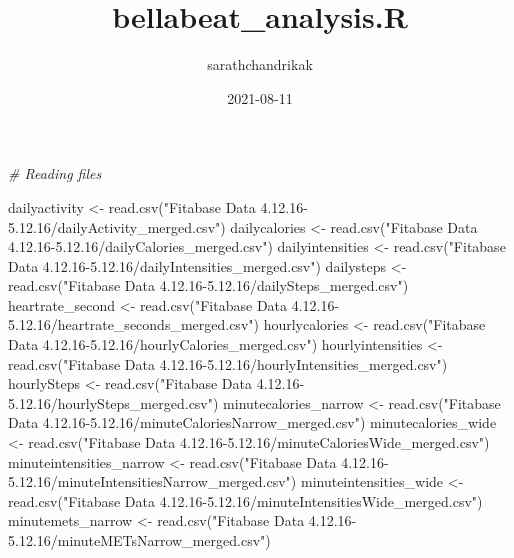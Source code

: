 \documentclass[
]{article}
\title{bellabeat\_analysis.R}
\author{sarathchandrikak}
\date{2021-08-11}
\newenvironment{Shaded}{\begin{snugshade}}{\end{snugshade}}
\newcommand{\CommentTok}[1]{\textcolor[rgb]{0.56,0.35,0.01}{\textit{#1}}}
\newcommand{\FunctionTok}[1]{\textcolor[rgb]{0.00,0.00,0.00}{#1}}
\newcommand{\NormalTok}[1]{#1}
\newcommand{\OtherTok}[1]{\textcolor[rgb]{0.56,0.35,0.01}{#1}}
\newcommand{\StringTok}[1]{\textcolor[rgb]{0.31,0.60,0.02}{#1}}
\begin{document}
\maketitle

\begin{Shaded}
\begin{Highlighting}[]
\CommentTok{\# Reading files}

\NormalTok{dailyactivity }\OtherTok{\textless{}{-}} \FunctionTok{read.csv}\NormalTok{(}\StringTok{"Fitabase Data 4.12.16{-}5.12.16/dailyActivity\_merged.csv"}\NormalTok{)}
\NormalTok{dailycalories }\OtherTok{\textless{}{-}} \FunctionTok{read.csv}\NormalTok{(}\StringTok{"Fitabase Data 4.12.16{-}5.12.16/dailyCalories\_merged.csv"}\NormalTok{)}
\NormalTok{dailyintensities }\OtherTok{\textless{}{-}} \FunctionTok{read.csv}\NormalTok{(}\StringTok{"Fitabase Data 4.12.16{-}5.12.16/dailyIntensities\_merged.csv"}\NormalTok{)}
\NormalTok{dailysteps }\OtherTok{\textless{}{-}} \FunctionTok{read.csv}\NormalTok{(}\StringTok{"Fitabase Data 4.12.16{-}5.12.16/dailySteps\_merged.csv"}\NormalTok{)}
\NormalTok{heartrate\_second }\OtherTok{\textless{}{-}} \FunctionTok{read.csv}\NormalTok{(}\StringTok{"Fitabase Data 4.12.16{-}5.12.16/heartrate\_seconds\_merged.csv"}\NormalTok{)}
\NormalTok{hourlycalories }\OtherTok{\textless{}{-}} \FunctionTok{read.csv}\NormalTok{(}\StringTok{"Fitabase Data 4.12.16{-}5.12.16/hourlyCalories\_merged.csv"}\NormalTok{)}
\NormalTok{hourlyintensities }\OtherTok{\textless{}{-}} \FunctionTok{read.csv}\NormalTok{(}\StringTok{"Fitabase Data 4.12.16{-}5.12.16/hourlyIntensities\_merged.csv"}\NormalTok{)}
\NormalTok{hourlySteps }\OtherTok{\textless{}{-}} \FunctionTok{read.csv}\NormalTok{(}\StringTok{"Fitabase Data 4.12.16{-}5.12.16/hourlySteps\_merged.csv"}\NormalTok{)}
\NormalTok{minutecalories\_narrow }\OtherTok{\textless{}{-}} \FunctionTok{read.csv}\NormalTok{(}\StringTok{"Fitabase Data 4.12.16{-}5.12.16/minuteCaloriesNarrow\_merged.csv"}\NormalTok{)}
\NormalTok{minutecalories\_wide }\OtherTok{\textless{}{-}} \FunctionTok{read.csv}\NormalTok{(}\StringTok{"Fitabase Data 4.12.16{-}5.12.16/minuteCaloriesWide\_merged.csv"}\NormalTok{)}
\NormalTok{minuteintensities\_narrow }\OtherTok{\textless{}{-}} \FunctionTok{read.csv}\NormalTok{(}\StringTok{"Fitabase Data 4.12.16{-}5.12.16/minuteIntensitiesNarrow\_merged.csv"}\NormalTok{)}
\NormalTok{minuteintensities\_wide }\OtherTok{\textless{}{-}} \FunctionTok{read.csv}\NormalTok{(}\StringTok{"Fitabase Data 4.12.16{-}5.12.16/minuteIntensitiesWide\_merged.csv"}\NormalTok{)}
\NormalTok{minutemets\_narrow }\OtherTok{\textless{}{-}} \FunctionTok{read.csv}\NormalTok{(}\StringTok{"Fitabase Data 4.12.16{-}5.12.16/minuteMETsNarrow\_merged.csv"}\NormalTok{)}

\end{Highlighting}
\end{Shaded}
\end{document}
